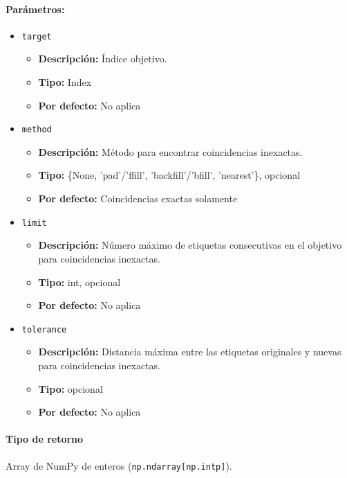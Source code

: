     \paragraph{Parámetros:}

    \begin{itemize}
        \item \texttt{target}
            \begin{itemize}
                \item \textbf{Descripción:} Índice objetivo.
                \item \textbf{Tipo:} Index
                \item \textbf{Por defecto:} No aplica
            \end{itemize}
        \item \texttt{method}
            \begin{itemize}
                \item \textbf{Descripción:} Método para encontrar coincidencias inexactas.
                \item \textbf{Tipo:} \{None, 'pad'/'ffill', 'backfill'/'bfill', 'nearest'\}, opcional
                \item \textbf{Por defecto:} Coincidencias exactas solamente
            \end{itemize}
        \item \texttt{limit}
            \begin{itemize}
                \item \textbf{Descripción:} Número máximo de etiquetas consecutivas en el objetivo para coincidencias inexactas.
                \item \textbf{Tipo:} int, opcional
                \item \textbf{Por defecto:} No aplica
            \end{itemize}
        \item \texttt{tolerance}
            \begin{itemize}
                \item \textbf{Descripción:} Distancia máxima entre las etiquetas originales y nuevas para coincidencias inexactas.
                \item \textbf{Tipo:} opcional
                \item \textbf{Por defecto:} No aplica
            \end{itemize}
    \end{itemize}

    \paragraph{Tipo de retorno}
    Array de NumPy de enteros (\texttt{np.ndarray[np.intp]}).



